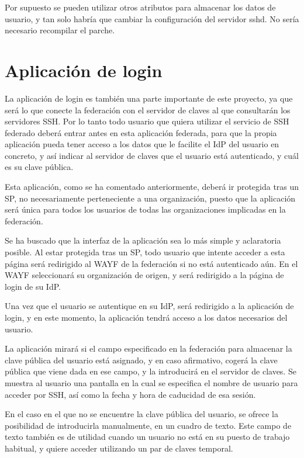     Por supuesto se pueden utilizar otros atributos para almacenar los
    datos de usuario, y tan solo habría que cambiar la configuración del
    servidor sshd. No sería necesario recompilar el parche.

    \section{Aplicación de login}
    \label{login}
    

    La aplicación de login es también una parte importante de este
    proyecto, ya que será lo que conecte la federación con el servidor de
    claves al que consultarán los servidores SSH. Por lo tanto todo usuario
    que quiera utilizar el servicio de SSH federado deberá entrar antes en
    esta aplicación federada, para que la propia aplicación pueda tener
    acceso a los datos que le facilite el IdP del usuario en concreto, y
    así indicar al servidor de claves que el usuario está autenticado, y
    cuál es su clave pública.

    Esta aplicación, como se ha comentado anteriormente, deberá ir
    protegida tras un SP, no necesariamente perteneciente a una
    organización, puesto que la aplicación será única para todos los
    usuarios de todas las organizaciones implicadas en la federación.

    Se ha buscado que la interfaz de la aplicación sea lo más simple y
    aclaratoria posible. Al estar protegida tras un SP, todo usuario que
    intente acceder a esta página será redirigido al WAYF de la federación
    si no está autenticado aún. En el WAYF seleccionará su organización de
    origen, y será redirigido a la página de login de su IdP.

    Una vez que el usuario se autentique en su IdP, será redirigido a la
    aplicación de login, y en este momento, la aplicación tendrá acceso a
    los datos necesarios del usuario.

    La aplicación mirará si el campo especificado en la federación para
    almacenar la clave pública del usuario está asignado, y en caso
    afirmativo, cogerá la clave pública que viene dada en ese campo, y la
    introducirá en el servidor de claves. Se muestra al usuario una
    pantalla en la cual se especifica el nombre de usuario para acceder por
    SSH, así como la fecha y hora de caducidad de esa sesión.

    En el caso en el que no se encuentre la clave pública del usuario, se
    ofrece la posibilidad de introducirla manualmente, en un cuadro de
    texto. Este campo de texto también es de utilidad cuando un usuario no
    está en su puesto de trabajo habitual, y quiere acceder utilizando un
    par de claves temporal.


